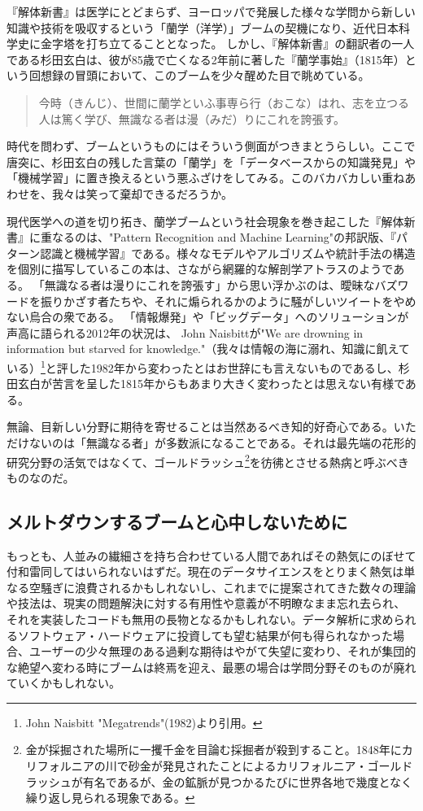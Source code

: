『解体新書』は医学にとどまらず、ヨーロッパで発展した様々な学問から新しい知識や技術を吸収するという「蘭学（洋学）」ブームの契機になり、近代日本科学史に金字塔を打ち立てることとなった。
しかし、『解体新書』の翻訳者の一人である杉田玄白は、彼が85歳で亡くなる2年前に著した『蘭学事始』（1815年）という回想録の冒頭において、このブームを少々醒めた目で眺めている。

\begin{quote}
今時（きんじ）、世間に蘭学といふ事専ら行（おこな）はれ、志を立つる人は篤く学び、無識なる者は漫（みだ）りにこれを誇張す。
\end{quote}

時代を問わず、ブームというものにはそういう側面がつきまとうらしい。ここで唐突に、杉田玄白の残した言葉の「蘭学」を「データベースからの知識発見」や「機械学習」に置き換えるという悪ふざけをしてみる。このバカバカしい重ねあわせを、我々は笑って棄却できるだろうか。

現代医学への道を切り拓き、蘭学ブームという社会現象を巻き起こした『解体新書』に重なるのは、"Pattern Recognition and Machine Learning"の邦訳版、『パターン認識と機械学習』である。様々なモデルやアルゴリズムや統計手法の構造を個別に描写しているこの本は、さながら網羅的な解剖学アトラスのようである。
「無識なる者は漫りにこれを誇張す」から思い浮かぶのは、曖昧なバズワードを振りかざす者たちや、それに煽られるかのように騒がしいツイートをやめない烏合の衆である。
「情報爆発」や「ビッグデータ」へのソリューションが声高に語られる2012年の状況は、
John Naisbittが"We are drowning in information but starved for knowledge."（我々は情報の海に溺れ、知識に飢えている）\footnote{John Naisbitt "Megatrends"(1982)より引用。}と評した1982年から変わったとはお世辞にも言えないものであるし、杉田玄白が苦言を呈した1815年からもあまり大きく変わったとは思えない有様である。

無論、目新しい分野に期待を寄せることは当然あるべき知的好奇心である。いただけないのは「無識なる者」が多数派になることである。それは最先端の花形的研究分野の活気ではなくて、ゴールドラッシュ\footnote{金が採掘された場所に一攫千金を目論む採掘者が殺到すること。1848年にカリフォルニアの川で砂金が発見されたことによるカリフォルニア・ゴールドラッシュが有名であるが、金の鉱脈が見つかるたびに世界各地で幾度となく繰り返し見られる現象である。}を彷彿とさせる熱病と呼ぶべきものなのだ。

\subsection{メルトダウンするブームと心中しないために}
もっとも、人並みの繊細さを持ち合わせている人間であればその熱気にのぼせて付和雷同してはいられないはずだ。現在のデータサイエンスをとりまく熱気は単なる空騒ぎに浪費されるかもしれないし、これまでに提案されてきた数々の理論や技法は、現実の問題解決に対する有用性や意義が不明瞭なまま忘れ去られ、それを実装したコードも無用の長物となるかもしれない。データ解析に求められるソフトウェア・ハードウェアに投資しても望む結果が何も得られなかった場合、ユーザーの少々無理のある過剰な期待はやがて失望に変わり、それが集団的な絶望へ変わる時にブームは終焉を迎え、最悪の場合は学問分野そのものが廃れていくかもしれない。

